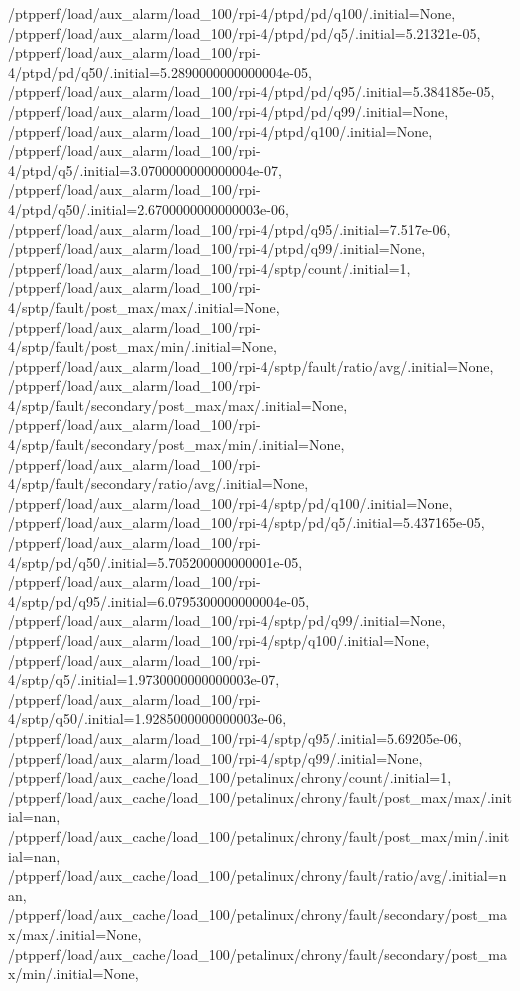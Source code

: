 {    /ptpperf/load/aux_alarm/load_100/rpi-4/ptpd/pd/q100/.initial=None,
    /ptpperf/load/aux_alarm/load_100/rpi-4/ptpd/pd/q5/.initial=5.21321e-05,
    /ptpperf/load/aux_alarm/load_100/rpi-4/ptpd/pd/q50/.initial=5.2890000000000004e-05,
    /ptpperf/load/aux_alarm/load_100/rpi-4/ptpd/pd/q95/.initial=5.384185e-05,
    /ptpperf/load/aux_alarm/load_100/rpi-4/ptpd/pd/q99/.initial=None,
    /ptpperf/load/aux_alarm/load_100/rpi-4/ptpd/q100/.initial=None,
    /ptpperf/load/aux_alarm/load_100/rpi-4/ptpd/q5/.initial=3.0700000000000004e-07,
    /ptpperf/load/aux_alarm/load_100/rpi-4/ptpd/q50/.initial=2.6700000000000003e-06,
    /ptpperf/load/aux_alarm/load_100/rpi-4/ptpd/q95/.initial=7.517e-06,
    /ptpperf/load/aux_alarm/load_100/rpi-4/ptpd/q99/.initial=None,
    /ptpperf/load/aux_alarm/load_100/rpi-4/sptp/count/.initial=1,
    /ptpperf/load/aux_alarm/load_100/rpi-4/sptp/fault/post_max/max/.initial=None,
    /ptpperf/load/aux_alarm/load_100/rpi-4/sptp/fault/post_max/min/.initial=None,
    /ptpperf/load/aux_alarm/load_100/rpi-4/sptp/fault/ratio/avg/.initial=None,
    /ptpperf/load/aux_alarm/load_100/rpi-4/sptp/fault/secondary/post_max/max/.initial=None,
    /ptpperf/load/aux_alarm/load_100/rpi-4/sptp/fault/secondary/post_max/min/.initial=None,
    /ptpperf/load/aux_alarm/load_100/rpi-4/sptp/fault/secondary/ratio/avg/.initial=None,
    /ptpperf/load/aux_alarm/load_100/rpi-4/sptp/pd/q100/.initial=None,
    /ptpperf/load/aux_alarm/load_100/rpi-4/sptp/pd/q5/.initial=5.437165e-05,
    /ptpperf/load/aux_alarm/load_100/rpi-4/sptp/pd/q50/.initial=5.705200000000001e-05,
    /ptpperf/load/aux_alarm/load_100/rpi-4/sptp/pd/q95/.initial=6.0795300000000004e-05,
    /ptpperf/load/aux_alarm/load_100/rpi-4/sptp/pd/q99/.initial=None,
    /ptpperf/load/aux_alarm/load_100/rpi-4/sptp/q100/.initial=None,
    /ptpperf/load/aux_alarm/load_100/rpi-4/sptp/q5/.initial=1.9730000000000003e-07,
    /ptpperf/load/aux_alarm/load_100/rpi-4/sptp/q50/.initial=1.9285000000000003e-06,
    /ptpperf/load/aux_alarm/load_100/rpi-4/sptp/q95/.initial=5.69205e-06,
    /ptpperf/load/aux_alarm/load_100/rpi-4/sptp/q99/.initial=None,
    /ptpperf/load/aux_cache/load_100/petalinux/chrony/count/.initial=1,
    /ptpperf/load/aux_cache/load_100/petalinux/chrony/fault/post_max/max/.initial=nan,
    /ptpperf/load/aux_cache/load_100/petalinux/chrony/fault/post_max/min/.initial=nan,
    /ptpperf/load/aux_cache/load_100/petalinux/chrony/fault/ratio/avg/.initial=nan,
    /ptpperf/load/aux_cache/load_100/petalinux/chrony/fault/secondary/post_max/max/.initial=None,
    /ptpperf/load/aux_cache/load_100/petalinux/chrony/fault/secondary/post_max/min/.initial=None,
}
